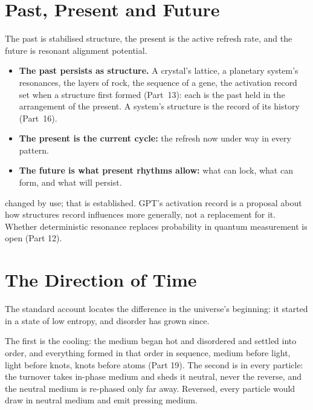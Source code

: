 \documentclass[11pt,a4paper]{article}
\begin{document}
\section{Past, Present and Future}
\label{sec:becoming}

The past is stabilised structure, the present is the active refresh rate, and the future is resonant alignment potential. 
\begin{itemize}
\item \textbf{The past persists as structure.} A crystal's lattice, a planetary system's resonances, the layers of rock, the sequence of a gene, the activation record set when a structure first formed (Part~13): each is the past held in the arrangement of the present. A system's structure is the record of its history (Part~16).
\item \textbf{The present is the current cycle:} the refresh now under way in every pattern.
\item \textbf{The future is what present rhythms allow:} what can lock, what can form, and what will persist.
\end{itemize}
 changed by use; that is established. GPT's activation record is a proposal about how structures record influences more generally, not a replacement for it. Whether deterministic resonance replaces probability in quantum measurement is open (Part 12).

\section{The Direction of Time}
\label{sec:arrow}

 The standard account locates the difference in the universe's beginning: it started in a state of low entropy, and disorder has grown since.

 The first is the cooling: the medium began hot and disordered and settled into order, and everything formed in that order in sequence, medium before light, light before knots, knots before atoms (Part 19). The second is in every particle: the turnover takes in-phase medium and sheds it neutral, never the reverse, and the neutral medium is re-phased only far away. Reversed, every particle would draw in neutral medium and emit pressing medium. 
\end{document}
